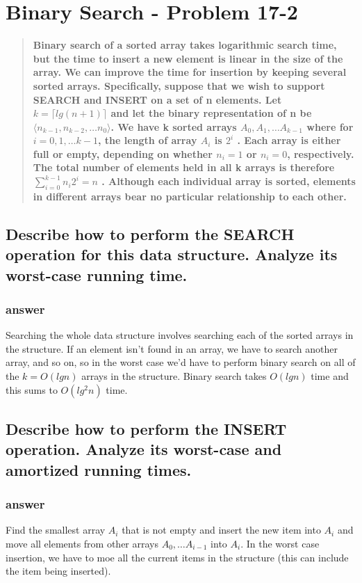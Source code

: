 \documentclass[titlepage]{article}\usepackage[]{graphicx}\usepackage[]{color}
\begin{document}
\section{Binary Search - Problem 17-2}
\begin{quote}
  \textbf{
	Binary search of a sorted array takes logarithmic search time, but the time
	to insert a new element is linear in the size of the array. We can improve
	the time for insertion by keeping several sorted arrays.  Specifically,
	suppose that we wish to support SEARCH and INSERT on a set of n elements.
	Let $k =  \lceil lg(n+1)\rceil $ and let the binary representation of n be
	$ \langle n_{ k-1 }, n_{k-2},\dots n_0 \rangle$.  We have k sorted arrays $
	A_0, A_1, \dots A_{k-1}$ where for $ i = 0, 1, \dots k-1$, the length of
	array $A_i$  is $2^i$ .  Each array is either full or empty, depending on
	whether $n_i = 1 $ or $n_i = 0$, respectively. The total number of elements
	held in all k arrays is therefore $\sum_{i = 0}^{k -1 } n_i 2^i = n $ .
	Although each individual array is sorted, elements in different arrays bear
	no particular relationship to each other.}
\end{quote}


\subsection{Describe how to perform the SEARCH operation for this data structure.
Analyze its worst-case running time.}
  \subsubsection{answer}
  Searching the whole data structure involves searching each of the
  sorted arrays in the structure. If an element isn't found in an array,
  we have to search another array, and so on, so in the worst case we'd
  have to perform binary search on all of the $k = O(lg n) $ arrays in
  the structure. Binary search takes $O(lg n)$ time and this sums to
  $O(lg^2 n)$ time. 

\subsection{Describe how to perform the INSERT operation. Analyze its
worst-case and amortized running times.  }
  \subsubsection{answer}
  Find the smallest array $A_i$ that is not empty and insert the new item
  into $A_i$ and move all elements from other arrays $A_0, \dots A_{i-1}$
  into $A_i$. In the worst case insertion, we have to moe all the current
  items in the structure (this can include the item being inserted). 
\end{document}
